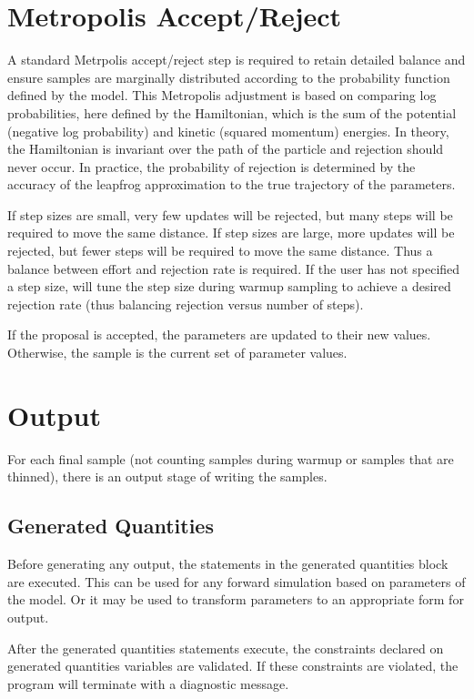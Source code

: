 \section{Metropolis Accept/Reject}

A standard Metrpolis accept/reject step is required to retain detailed
balance and ensure samples are marginally distributed according to the
probability function defined by the model.  This Metropolis adjustment
is based on comparing log probabilities, here defined by the
Hamiltonian, which is the sum of the potential (negative log
probability) and kinetic (squared momentum) energies.  In theory, the
Hamiltonian is invariant over the path of the particle and rejection
should never occur.  In practice, the probability of rejection is
determined by the accuracy of the leapfrog approximation to the true
trajectory of the parameters.

If step sizes are small, very few updates will be rejected, but many
steps will be required to move the same distance.  If step sizes are
large, more updates will be rejected, but fewer steps will be required
to move the same distance.  Thus a balance between effort and
rejection rate is required.  If the user has not specified a step
size, \Stan will tune the step size during warmup sampling to achieve
a desired rejection rate (thus balancing rejection versus number of
steps).

If the proposal is accepted, the parameters are updated to their new
values.  Otherwise, the sample is the current set of parameter values.


\section{Output}

For each final sample (not counting samples during warmup or samples
that are thinned), there is an output stage of writing the samples.

\subsection{Generated Quantities} 

Before generating any output, the statements in the generated quantities 
block are executed.  This can be used for any forward simulation based
on parameters of the model.  Or it may be used to transform parameters
to an appropriate form for output.  

After the generated quantities statements execute, the constraints
declared on generated quantities variables are validated.   If these
constraints are violated, the program will terminate with a diagnostic message.

